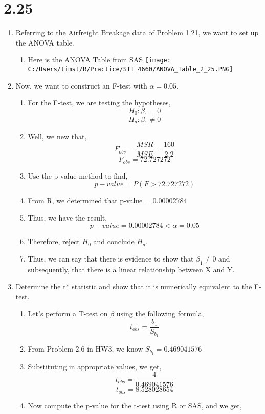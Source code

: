 \documentclass{article}
\begin{document}
\section*{2.25}
	\begin{enumerate}[label = \alph*)]
		\item Referring to the Airfreight Breakage data of Problem 1.21, we want to set up the ANOVA table.
		\begin{enumerate}[label = \arabic*)]
			\item Here is the ANOVA Table from SAS
			\centering
			\texttt{[image: C:/Users/timst/R/Practice/STT 4660/ANOVA\_Table\_2\_25.PNG]}
		\end{enumerate}
		\item Now, we want to construct an F-test with $\alpha = 0.05$.
		\begin{enumerate}[label = \arabic*)]
			\item For the F-test, we are testing the hypotheses,
			\[H_0: \beta_1 = 0\]
			\[H_a: \beta_1 \neq 0\]
			\item Well, we new that,
			\[F_{obs} = \frac{MSR}{MSE} = \frac{160}{2.2}\]
			\[F_{obs} = 72.727272\]
			\item Use the p-value method to find,
			\[p-value = P(F > 72.727272)\]
			\item From R, we determined that p-value = 0.00002784
			\item Thus, we have the result,
			\[p-value = 0.00002784 < \alpha = 0.05\]
			\item Therefore, reject $H_0$ and conclude $H_a$.
			\item Thus, we can say that there is evidence to show that $\beta_1 \neq 0$ and subsequently, that there is a linear relationship between X and Y.
		\end{enumerate}
		\item Determine the t* statistic and show that it is numerically equivalent to the F-test.
		\begin{enumerate}[label = \arabic*)]
			\item Let's perform a T-test on $\beta$ using the following formula,
			\[t_{obs} = \frac{b_1}{S_{b_1}}\]
			\item From Problem 2.6 in HW3, we know $S_{b_1} = 0.469041576$
			\item Substituting in appropriate values, we get,
			\[t_{obs} = \frac{4}{0.469041576}\]
			\[t_{obs} = 8.528028654\]
			\item Now compute the p-value for the t-test using R or SAS, and we get,

\end{enumerate}
\end{enumerate}
\end{document}
